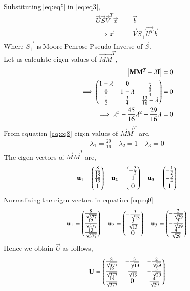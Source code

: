 \documentclass[journal,12pt,twocolumn]{IEEEtran}
\begin{document}
Substituting \eqref{eq:eq5} in \eqref{eq:eq3},
\begin{align}
\vec{U}\vec{S}\vec{V}^T\vec{x} & = \vec{b}\\
\implies\vec{x} &= \vec{V}\vec{S_+}\vec{U^T}\vec{b}\label{eq:eq7}
\end{align}
Where $\vec{S_+}$ is Moore-Penrose Pseudo-Inverse of $\vec{S}$. \\
Let us calculate eigen values of $\vec{M}\vec{M}^T$,
\begin{align}
\begin{vmatrix}\mathbf{M}\mathbf{M}^T - \lambda\mathbf{I}\end{vmatrix} &= 0\\
\implies\begin{pmatrix}1-\lambda&0&\frac{1}{2}\\0&1-\lambda&\frac{3}{4}\\\frac{1}{2}&\frac{3}{4}&\frac{13}{16}-\lambda\end{pmatrix} &=0\\
\implies\lambda^3-\frac{45}{16}\lambda^2+\frac{29}{16}\lambda &=0 \label{eq:eq8}
\end{align}
From equation \eqref{eq:eq8} eigen values of $\vec{M}\vec{M}^T$ are,
\begin{align}
\lambda_1 = \frac{29}{16} \quad
\lambda_2 = 1 \quad
\lambda_3 = 0
\end{align}
The eigen vectors of $\vec{M}\vec{M}^T$ are,
\begin{align}
\mathbf{u}_1=\begin{pmatrix}\frac{8}{13}\\\frac{12}{13}\\1\end{pmatrix}\quad
\mathbf{u}_2=\begin{pmatrix}-\frac{3}{2}\\1\\0\end{pmatrix}\quad
\mathbf{u}_3=\begin{pmatrix}-\frac{1}{2}\\-\frac{3}{4}\\1\end{pmatrix}\label{eq:eq9}
\end{align}
Normalizing the eigen vectors in equation \eqref{eq:eq9}
\begin{align}
\mathbf{u}_1=\begin{pmatrix}\frac{8}{\sqrt{377}}\\\frac{12}{\sqrt{377}}\\\frac{13}{\sqrt{377}}\end{pmatrix}\quad
\mathbf{u}_2=\begin{pmatrix}-\frac{3}{\sqrt{13}}\\\frac{2}{\sqrt{13}}\\0\end{pmatrix}\quad
\mathbf{u}_3=\begin{pmatrix}-\frac{2}{\sqrt{29}}\\-\frac{3}{\sqrt{29}}\\\frac{4}{\sqrt{29}}\end{pmatrix}
\end{align}
Hence we obtain $\vec{U}$ as follows,
\begin{align}
\mathbf{U}=\begin{pmatrix}\frac{8}{\sqrt{377}}&-\frac{3}{\sqrt{13}}&-\frac{2}{\sqrt{29}}\\\frac{12}{\sqrt{377}}&\frac{2}{\sqrt{13}}&-\frac{3}{\sqrt{29}}\\
\frac{13}{\sqrt{377}}&0&\frac{4}{\sqrt{29}}\end{pmatrix}\label{eq:eq10}
\end{align}
\end{document}
